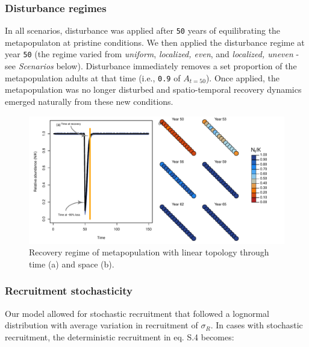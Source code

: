 \documentclass[
]{article}
\begin{document}
\hypertarget{disturbance-regimes}{%
\subsubsection{Disturbance regimes}\label{disturbance-regimes}}

In all scenarios, disturbance was applied after \texttt{50} years of
equilibrating the metapopulaton at pristine conditions. We then applied
the disturbance regime at year \texttt{50} (the regime varied from
\emph{uniform}, \emph{localized, even}, and \emph{localized, uneven} -
see \emph{Scenarios} below). Disturbance immediately removes a set
proportion of the metapopulation adults at that time (i.e., \texttt{0.9}
of \(A_{t=50}\)). Once applied, the metapopulation was no longer
disturbed and spatio-temporal recovery dynamics emerged naturally from
these new conditions.

\begin{figure}[H]

{\centering \includegraphics{Managing_for_ecological_surprises_in_metapopulations_files/figure-latex/example disturbance regime-1} 

}

\caption{Recovery regime of metapopulation with linear topology through time (a) and space (b).}\label{fig:example disturbance regime}
\end{figure}

\hypertarget{recruitment-stochasticity}{%
\subsubsection{Recruitment
stochasticity}\label{recruitment-stochasticity}}

Our model allowed for stochastic recruitment that followed a lognormal
distribution with average variation in recruitment of \(\sigma_R\). In
cases with stochastic recruitment, the deterministic recruitment in eq.
S.4 becomes:
\end{document}
